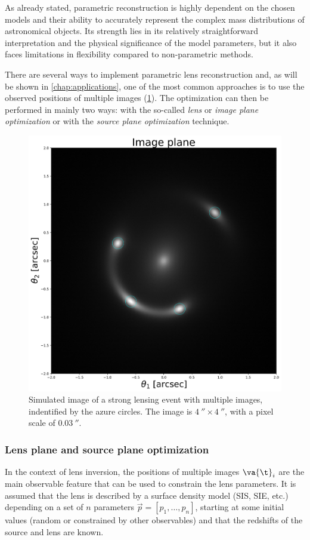 As already stated, parametric reconstruction is highly dependent on the chosen models and their ability to accurately represent the complex mass distributions of astronomical objects. Its strength lies in its relatively straightforward interpretation and the physical significance of the model parameters, but it also faces limitations in flexibility compared to non-parametric methods.

There are several ways to implement parametric lens reconstruction and, as will be shown in \cref{chap:applications}, one of the most common approaches is to use the observed positions of multiple images (\cref{fig:multiple_images_param}).
The optimization can then be performed in mainly two ways: with the so-called \emph{lens} or \emph{image plane optimization} or with the \emph{source plane optimization} technique.

\begin{figure}
    \centering
    \includegraphics[width=0.6\linewidth, keepaspectratio]{img//chapter4/multiple_images_param.png}
    \caption[Simulated image of a strong lensing event with multiple images]{Simulated image of a strong lensing event with multiple images, indentified by the azure circles. The image is $\SI{4}{\arcsecond} \times \SI{4}{\arcsecond}$, with a pixel scale of $\SI{0.03}{\arcsecond}$.}
    \label{fig:multiple_images_param}
\end{figure}

\subsubsection{Lens plane and source plane optimization}
\label{subsubsec:lens_plane_source_plane_optimization}
In the context of lens inversion, the positions of multiple images $\va{\t}_i$ are the main observable feature that can be used to constrain the lens parameters. It is assumed that the lens is described by a surface density model (\eg SIS, SIE, etc.) depending on a set of $n$ parameters $\vec{p} = [p_1, \ldots, p_n]$, starting at some initial values (random or constrained by other observables) and that the redshifts of the source and lens are known.

